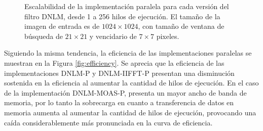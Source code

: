

\begin{figure}[H]
\centering
  \caption[Escalabilidad de la implementaci\'on paralela para cada versi\'on del filtro DNLM, desde 1 a 256 hilos de ejecuci\'on.]{Escalabilidad de la implementaci\'on paralela para cada versi\'on del filtro DNLM, desde 1 a 256 hilos de ejecuci\'on. El tama\~no de la imagen de entrada es de $1024\times1024$, con tama\~no de ventana de b\'usqueda de $21 \times 21$ y vencidario de $7 \times 7$ pixeles.}
  \end{figure}
  
  Siguiendo la misma tendencia, la eficiencia de las implementaciones paralelas se muestran en la Figura \ref{fig:efficiency}. Se aprecia que la eficiencia de las implementaciones DNLM-P y DNLM-IIFFT-P presentan una disminuci\'on sostenida en la eficiencia al aumentar la cantidad de hilos de ejecuci\'on. En el caso de la implementaci\'on DNLM-MOAS-P, presenta un mayor ancho de banda de memoria, por lo tanto la sobrecarga en cuanto a transferencia de datos en memoria aumenta al aumentar la cantidad de hilos de ejecuci\'on, provocando una ca\'ida considerablemente m\'as pronunciada en la curva de eficiencia.
  
